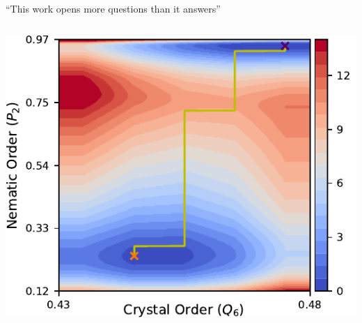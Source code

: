 \documentclass[aspectratio=169]{beamer}
\begin{document}
\begin{frame}[c]{``This work opens more questions than it answers''}
\begin{columns}[T, onlytextwidth]
    \vspace{2.5ex}

    \includegraphics[width=\textwidth]{../figures//fig-pathway_10p25/subfig-pathway_10p25_MFEP.pdf}

  \end{columns}

\end{frame}

\end{document}
